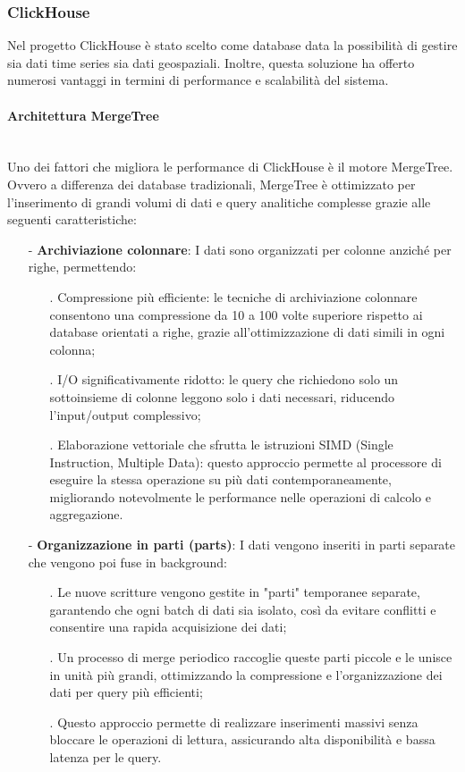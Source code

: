 \documentclass[10pt]{article}
\newcommand{\myparagraph}[1]{\paragraph{#1}\mbox{}\\}
\begin{document}
        \subsubsection{ClickHouse}
        Nel progetto ClickHouse è stato scelto come database data la possibilità di gestire sia dati time series sia dati geospaziali.
        Inoltre, questa soluzione ha offerto numerosi vantaggi in termini di performance e scalabilità del sistema.

        \myparagraph{Architettura MergeTree}
        Uno dei fattori che migliora le performance di ClickHouse è il motore MergeTree.
        Ovvero a differenza dei database tradizionali, MergeTree è ottimizzato per l'inserimento di grandi volumi di dati e query analitiche complesse grazie alle seguenti caratteristiche:

        \begin{itemize}
            \item[-] \textbf{Archiviazione colonnare}: I dati sono organizzati per colonne anziché per righe, permettendo:
            \begin{itemize}
                \item[.] Compressione più efficiente: le tecniche di archiviazione colonnare consentono una compressione da 10 a 100 volte superiore rispetto ai database orientati a righe, grazie all'ottimizzazione di dati simili in ogni colonna;
                \item[.] I/O significativamente ridotto: le query che richiedono solo un sottoinsieme di colonne leggono solo i dati necessari, riducendo l'input/output complessivo;
                \item[.] Elaborazione vettoriale che sfrutta le istruzioni SIMD (Single Instruction, Multiple Data): questo approccio permette al processore di eseguire la stessa operazione su più dati contemporaneamente, migliorando notevolmente le performance nelle operazioni di calcolo e aggregazione.
            \end{itemize}

            \item[-] \textbf{Organizzazione in parti (parts)}: I dati vengono inseriti in parti separate che vengono poi fuse in background:
            \begin{itemize}
                \item[.] Le nuove scritture vengono gestite in "parti" temporanee separate, garantendo che ogni batch di dati sia isolato, così da evitare conflitti e consentire una rapida acquisizione dei dati;
                \item[.] Un processo di merge periodico raccoglie queste parti piccole e le unisce in unità più grandi, ottimizzando la compressione e l'organizzazione dei dati per query più efficienti;
                \item[.] Questo approccio permette di realizzare inserimenti massivi senza bloccare le operazioni di lettura, assicurando alta disponibilità e bassa latenza per le query.
            \end{itemize}


\end{itemize}
\end{document}
